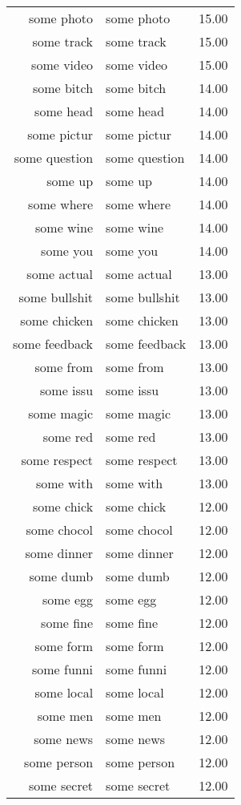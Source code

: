 \begin{table}[ht]
\begin{tabular}{rlr}
  some photo & some photo & 15.00 \\ 
  some track & some track & 15.00 \\ 
  some video & some video & 15.00 \\ 
  some bitch & some bitch & 14.00 \\ 
  some head & some head & 14.00 \\ 
  some pictur & some pictur & 14.00 \\ 
  some question & some question & 14.00 \\ 
  some up & some up & 14.00 \\ 
  some where & some where & 14.00 \\ 
  some wine & some wine & 14.00 \\ 
  some you & some you & 14.00 \\ 
  some actual & some actual & 13.00 \\ 
  some bullshit & some bullshit & 13.00 \\ 
  some chicken & some chicken & 13.00 \\ 
  some feedback & some feedback & 13.00 \\ 
  some from & some from & 13.00 \\ 
  some issu & some issu & 13.00 \\ 
  some magic & some magic & 13.00 \\ 
  some red & some red & 13.00 \\ 
  some respect & some respect & 13.00 \\ 
  some with & some with & 13.00 \\ 
  some chick & some chick & 12.00 \\ 
  some chocol & some chocol & 12.00 \\ 
  some dinner & some dinner & 12.00 \\ 
  some dumb & some dumb & 12.00 \\ 
  some egg & some egg & 12.00 \\ 
  some fine & some fine & 12.00 \\ 
  some form & some form & 12.00 \\ 
  some funni & some funni & 12.00 \\ 
  some local & some local & 12.00 \\ 
  some men & some men & 12.00 \\ 
  some news & some news & 12.00 \\ 
  some person & some person & 12.00 \\ 
  some secret & some secret & 12.00 \\ 

\end{tabular}
\end{table}
